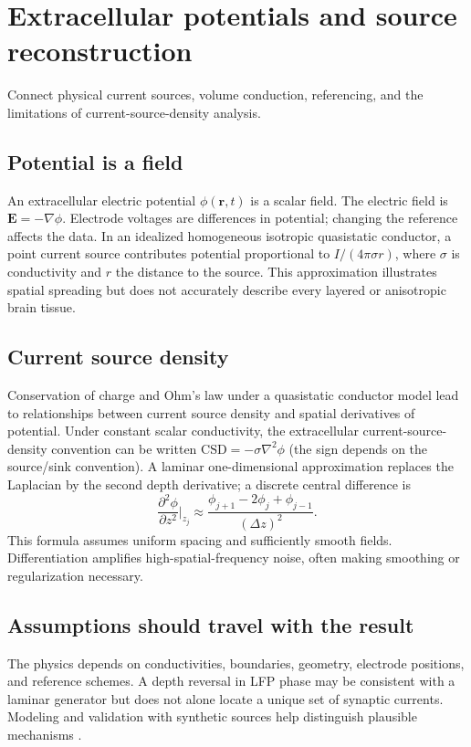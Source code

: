 \chapter{Extracellular potentials and source reconstruction}\label{ch:biophysics}
\begin{readergoal}Connect physical current sources, volume conduction, referencing, and the limitations of current-source-density analysis.\end{readergoal}
\section{Potential is a field}
An extracellular electric potential $\phi(\mathbf r,t)$ is a scalar field. The electric field is $\mathbf E=-\nabla\phi$. Electrode voltages are differences in potential; changing the reference affects the data. In an idealized homogeneous isotropic quasistatic conductor, a point current source contributes potential proportional to $I/(4\pi\sigma r)$, where $\sigma$ is conductivity and $r$ the distance to the source. This approximation illustrates spatial spreading but does not accurately describe every layered or anisotropic brain tissue.

\section{Current source density}
Conservation of charge and Ohm's law under a quasistatic conductor model lead to relationships between current source density and spatial derivatives of potential. Under constant scalar conductivity, the extracellular current-source-density convention can be written $\mathrm{CSD}=-\sigma\nabla^2\phi$ (the sign depends on the source/sink convention). A laminar one-dimensional approximation replaces the Laplacian by the second depth derivative; a discrete central difference is
\[\frac{\partial^2\phi}{\partial z^2}\Big|_{z_j}\approx\frac{\phi_{j+1}-2\phi_j+\phi_{j-1}}{(\Delta z)^2}.\]
This formula assumes uniform spacing and sufficiently smooth fields. Differentiation amplifies high-spatial-frequency noise, often making smoothing or regularization necessary.

\section{Assumptions should travel with the result}
The physics depends on conductivities, boundaries, geometry, electrode positions, and reference schemes. A depth reversal in LFP phase may be consistent with a laminar generator but does not alone locate a unique set of synaptic currents. Modeling and validation with synthetic sources help distinguish plausible mechanisms \cite{Buzsaki2012,Einevoll2013}.

